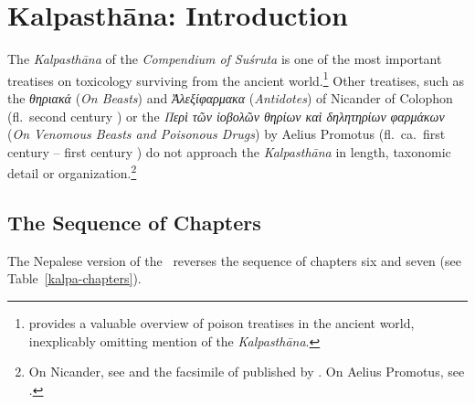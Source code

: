 
\chapter{Kalpasthāna: Introduction}

The \emph{Kalpasthāna} of the \emph{Compendium of Suśruta} is one of
the most important treatises on toxicology surviving from the ancient
world.\footnote{\citet{liu-2021} provides a valuable overview of
    poison treatises in the ancient world, inexplicably omitting mention
    of the \emph{Kalpasthāna}.} Other treatises, such as the
    \emph{\textgreek{θηριακά}} (\emph{On Beasts}) and
    \emph{\textgreek{Ἀλεξίφαρμακα}} (\emph{Antidotes}) of Nicander of
    Colophon (fl.\ second century \BCE) or the \emph{\textgreek{Περὶ τῶν
            ἰοβολῶν θηρίων καὶ δηλητηρίων φαρμάκων}} (\emph{On Venomous 
            Beasts and
        Poisonous Drugs}) by Aelius Promotus (fl.\ ca.\ first century \BCE --
    first century \CE) do not approach the \emph{Kalpasthāna} in length,
    taxonomic detail or organization.\footnote{On Nicander, see
        \cite{gow-1953} and the facsimile of 
        published by \citet{touw-1997}.  On Aelius Promotus, see
        \cites[29]{smit-1870}[363--368]{gost-1897}{ihm-1995}.}


\section{The Sequence of Chapters}
\label{kalpa-chapter-sequence}

The Nepalese version of the \SS\ reverses the sequence of chapters six and 
seven (see 
Table~\ref{kalpa-chapters}).

